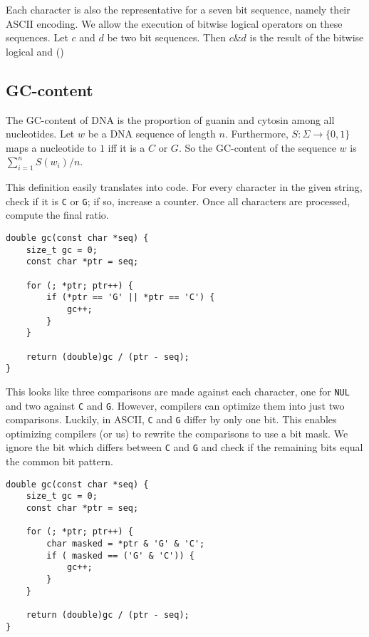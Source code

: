 \documentclass[10pt,letterpaper]{article}
\begin{document}
Each character is also the representative for a seven bit sequence, namely their ASCII encoding. We allow the execution of bitwise logical operators on these sequences. Let $c$ and $d$ be two bit sequences. Then $c {\&} d$ is the result of the bitwise logical and ()


\subsection{GC-content}
\label{sec:gccontent}

The GC-content of DNA is the proportion of guanin and cytosin among all nucleotides. Let $w$ be a DNA sequence of length $n$. Furthermore, $S\colon \Sigma \to \{0,1\}$ maps a nucleotide to $1$ iff it is a $C$ or $G$. So the GC-content of the sequence $w$ is $\sum_{i=1}^n S(w_i) / n$.

This definition easily translates into code. For every character in the given string, check if it is \lstinline!C! or \lstinline!G!; if so, increase a counter. Once all characters are processed, compute the final ratio.


\lstset{style=algo}

\begin{lstlisting}
double gc(const char *seq) {  
    size_t gc = 0;
    const char *ptr = seq;

    for (; *ptr; ptr++) {
        if (*ptr == 'G' || *ptr == 'C') {
            gc++;
        }
    }

    return (double)gc / (ptr - seq);
}
\end{lstlisting}

This looks like three comparisons are made against each character, one for \lstinline!NUL! and two against \lstinline!C! and \lstinline!G!. However, compilers can optimize them into just two comparisons. Luckily, in ASCII, \lstinline!C! and \lstinline!G! differ by only one bit. This enables optimizing compilers (or us) to rewrite the comparisons to use a bit mask. We ignore the bit which differs between \lstinline!C! and \lstinline!G! and check if the remaining bits equal the common bit pattern.

\begin{lstlisting}
double gc(const char *seq) {  
    size_t gc = 0;
    const char *ptr = seq;

    for (; *ptr; ptr++) {
    	char masked = *ptr & 'G' & 'C';
        if ( masked == ('G' & 'C')) {
            gc++;
        }
    }

    return (double)gc / (ptr - seq);
}
\end{lstlisting}
\end{document}
